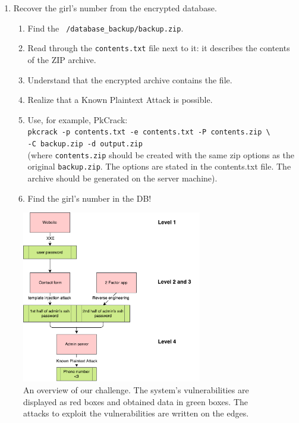 \documentclass[a4paper]{article}
\begin{document}
\begin{enumerate}
      \item Recover the girl's number from the encrypted database.
        \begin{enumerate}
          \item Find the \texttt{~/database\_backup/backup.zip}.
          \item Read through the \texttt{contents.txt} file next to it:
            it describes the contents of the ZIP archive.
          \item Understand that the encrypted archive contains the file.
          \item Realize that a Known Plaintext Attack is possible.
          \item Use, for example, PkCrack:\\
            \texttt{pkcrack -p contents.txt -e contents.txt -P contents.zip \textbackslash}\\
            \texttt{-C backup.zip -d output.zip}\\
            (where \texttt{contents.zip} should be created with the same zip
            options as the original \texttt{backup.zip}. The options are stated
            in the contents.txt file. The archive should be generated on the
            server machine).
          \item Find the girl's number in the DB!
        \end{enumerate}

\end{enumerate}

\begin{figure}
    \begin{center}
    \includegraphics[width=0.7\textwidth]{images/diagram}
    \end{center}
    \caption{An overview of our challenge. The system's vulnerabilities
    are displayed as red boxes and obtained data in green boxes. The attacks
    to exploit the vulnerabilities are written on the edges.}
    \label{fig:diag}
\end{figure}
\end{document}
